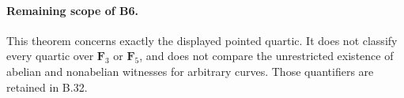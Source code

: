 \paragraph{Remaining scope of B6.}
This theorem concerns exactly the displayed pointed quartic. It does
not classify every quartic over $\mathbf F _3$ or $\mathbf F _5$,
and does not compare the unrestricted existence of abelian and
nonabelian witnesses for arbitrary curves. Those quantifiers are
retained in B.32.
